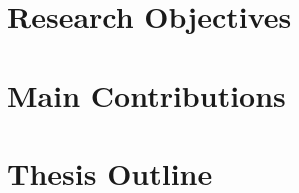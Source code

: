 \section{Research Objectives} %
\label{sec:research_objectives_introduction}


\section{Main Contributions} %
\label{sec:main_contributions_introduction}


\section{Thesis Outline} %
\label{sec:thesis_outline_introduction}


